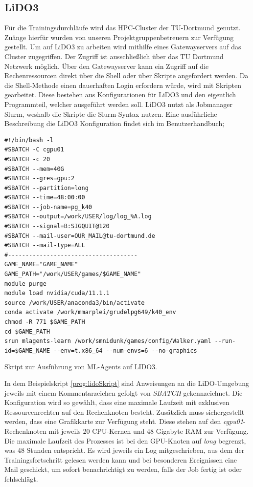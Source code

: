 \subsection{LiDO3}
Für die Trainingsdurchläufe wird das HPC-Cluster der TU-Dortmund genutzt. Zuänge hierfür wurden von unseren Projektgruppenbetreuern zur Verfügung gestellt. Um auf LiDO3 zu arbeiten wird mithilfe eines Gatewayservers auf das Cluster zugegriffen. Der Zugriff ist ausschließlich über das TU Dortmund Netzwerk möglich. Über den Gatewayserver kann ein Zugriff auf die Rechenressourcen direkt über die Shell oder über Skripte angefordert werden. Da die Shell-Methode einen dauerhaften Login erfordern würde, wird mit Skripten gearbeitet. Diese bestehen aus Konfigurationen für LiDO3 und den eigentlich Programmteil, welcher ausgeführt werden soll. LiDO3 nutzt als Jobmanager Slurm, weshalb die Skripte die Slurm-Syntax nutzen. Eine ausführliche Beschreibung die LiDO3 Konfiguration findet sich im Benutzerhandbuch\cite{lido};
\begin{listing}
	\begin{verbatim}
#!/bin/bash -l
#SBATCH -C cgpu01
#SBATCH -c 20
#SBATCH --mem=40G
#SBATCH --gres=gpu:2
#SBATCH --partition=long
#SBATCH --time=48:00:00
#SBATCH --job-name=pg_k40
#SBATCH --output=/work/USER/log/log_%A.log
#SBATCH --signal=B:SIGQUIT@120
#SBATCH --mail-user=OUR_MAIL@tu-dortmund.de
#SBATCH --mail-type=ALL
#-------------------------------------
GAME_NAME="GAME_NAME"
GAME_PATH="/work/USER/games/$GAME_NAME"
module purge
module load nvidia/cuda/11.1.1
source /work/USER/anaconda3/bin/activate
conda activate /work/mmarplei/grudelpg649/k40_env
chmod -R 771 $GAME_PATH
cd $GAME_PATH
srun mlagents-learn /work/smnidunk/games/config/Walker.yaml --run-id=$GAME_NAME --env=t.x86_64 --num-envs=6 --no-graphics
	\end{verbatim}
	\caption{Skript zur Ausführung von ML-Agents auf LIDO3.}
	\label{prog:lidoSkript}
\end{listing}

In dem Beispielskript \ref{prog:lidoSkript} sind Anweisungen an die LiDO-Umgebung jeweils mit einem Kommentarzeichen gefolgt von \emph{SBATCH} gekennzeichnet. Die Konfiguration wird so gewählt, dass eine maximale Laufzeit mit exklusiven Ressourcenrechten auf den Rechenknoten besteht. Zusätzlich muss sichergestellt werden, dass eine Grafikkarte zur Verfügung steht. Diese stehen auf den \emph{cgpu01}-Rechenknoten mit jeweils 20 CPU-Kernen und 48 Gigabyte RAM zur Verfügung. Die maximale Laufzeit des Prozesses ist bei den GPU-Knoten auf \emph{long} begrenzt, was 48 Stunden entspricht. Es wird jeweils ein Log mitgeschrieben, aus dem der Trainingsfortschritt gelesen werden kann und bei besonderen Ereignissen eine Mail geschickt, um sofort benachrichtigt zu werden, falls der Job fertig ist oder fehlschlägt.

